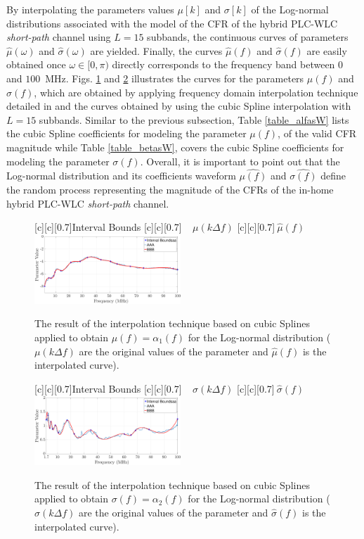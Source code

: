 \documentclass[journal]{IEEEtran}
\begin{document}
By interpolating the parameters values $\mu[k]$ and $\sigma[k]$ of the Log-normal distributions associated with the model of the \ac{CFR} of the hybrid \ac{PLC}-\ac{WLC} \textit{short-path} channel using $L=15$ subbands, the continuous curves of parameters $\hat{\mu}(\omega)$ and $\hat{\sigma}(\omega)$ are yielded. Finally, the curves $\hat{\mu}(f)$ and $\hat{\sigma}(f)$ are easily obtained once $\omega \in [0,\pi)$ directly corresponds to the frequency band between $0$ and $100$~MHz. Figs. \ref{Fit_alfasW} and \ref{Fit_betasW} illustrates the curves for the parameters $\mu(f)$ and $\sigma(f)$, which are obtained by applying frequency domain interpolation technique detailed in \cite{mitra} and the curves obtained by using the cubic Spline interpolation with $L=15$ subbands. Similar to the previous subsection, Table \ref{table_alfasW} lists the cubic Spline coefficients for modeling the parameter $\mu(f)$, of the valid \ac{CFR} magnitude while Table \ref{table_betasW}, covers the cubic Spline coefficients for modeling the parameter $\sigma(f)$. Overall, it is important to point out that the Log-normal distribution and its coefficients waveform $\hat{\mu(f)}$ and $\hat{\sigma(f)}$ define the random process representing the magnitude of the \acp{CFR} of the in-home hybrid \ac{PLC}-\ac{WLC} \textit{short-path} channel.

\begin{figure}[h]
	\centering
	[c][0.7]{Interval Bounds}
	[c][0.7]{$~~~~~\mu(k \Delta f)$}
	[c][0.7]{$~\hat{\mu}(f)$}
	\includegraphics[width=0.49\textwidth]{images/Alfa_fitsW.eps}
	\caption{The result of the interpolation technique based on cubic Splines applied to obtain $\mu(f)=\alpha_1(f)$ for the Log-normal distribution (${\mu}(k \Delta f)$ are the original values of the parameter and $\hat{\mu}(f)$ is the interpolated curve).}
	\label{Fit_alfasW}
\end{figure}

\begin{figure}[h]
	\centering
	[c][0.7]{Interval Bounds}
	[c][0.7]{${~~~~~\sigma}(k \Delta f)$}
	[c][0.7]{$~\hat{\sigma}(f)$}
	\includegraphics[width=0.49\textwidth]{images/Beta_fitsW.eps}
	\caption{The result of the interpolation technique based on cubic Splines applied to obtain $\sigma(f)=\alpha_2(f)$ for the Log-normal distribution (${\sigma}(k \Delta f)$ are the original values of the parameter and $\hat{\sigma}(f)$ is the interpolated curve).}
	\label{Fit_betasW}
\end{figure}
\end{document}
